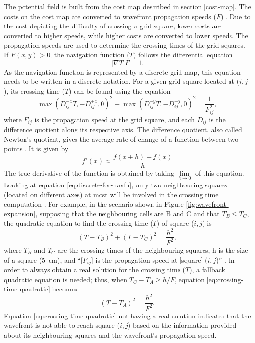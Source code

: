 The potential field is built from the cost map described in section \ref{cost-map}. The costs on the cost map are converted to wavefront propagation speeds ($F$) \parencite{philippsenInterpolatedDynamicNavigation2005}. Due to the cost depicting the difficulty of crossing a grid square, lower costs are converted to higher speeds, while higher costs are converted to lower speeds. The propagation speeds are used to determine the crossing times of the grid squares. If $F(x,y)>0$, the navigation function ($T$) follows the differential equation
\[
    |\nabla T|F=1.
\]
As the navigation function is represented by a discrete grid map, this equation needs to be written in a discrete notation. For a given grid square located at ($i,j$), its crossing time ($T$) can be found using the equation
\begin{equation} \label{eq:discrete-for-navfn}
    \max(D_{ij}^{-x}T,-D_{ij}^{+x},0)^2+\max(D_{ij}^{-y}T,-D_{ij}^{+y},0)^2=\frac{1}{F_{ij}^2},
\end{equation}
where $F_{ij}$ is the propagation speed at the grid square, and each $D_{ij}$ is the difference quotient along its respective axis. The difference quotient, also called Newton's quotient, gives the average rate of change of a function between two points \parencite{DifferenceQuotient2023}. It is given by
\[
    f'(x)\approx\frac{f(x+h)-f(x)}{h}
\]
The true derivative of the function is obtained by taking $\lim\limits_{h\to0}$ of this equation. Looking at equation \ref{eq:discrete-for-navfn}, only two neighbouring squares (located on different axes) at most will be involved in the crossing time computation \parencite{philippsenInterpolatedDynamicNavigation2005}. For example, in the scenario shown in Figure \ref{fig:wavefront-expansion}, supposing that the neighbouring cells are B and C and that $T_B\leqslant T_C$, the quadratic equation to find the crossing time ($T$) of square ($i,j$) is
\begin{equation} \label{eq:crossing-time-quadratic}
    (T-T_B)^2+(T-T_C)^2=\frac{h^2}{F^2},
\end{equation}
where $T_B$ and $T_C$ are the crossing times of the neighbouring squares, h is the size of a square (\qty{5}{cm}), and ``[$F_{ij}$] is the propagation speed at [square] ($i,j$)'' \parencite{philippsenInterpolatedDynamicNavigation2005}. In order to always obtain a real solution for the crossing time ($T$), a fallback quadratic equation is needed; thus, when $T_C-T_A\geqslant h/F$, equation \ref{eq:crossing-time-quadratic} becomes
\[
    (T-T_A)^2=\frac{h^2}{F^2}.
\]
Equation \ref{eq:crossing-time-quadratic} not having a real solution indicates that the wavefront is not able to reach square ($i,j$) based on the information provided about its neighbouring squares and the wavefront's propagation speed.

